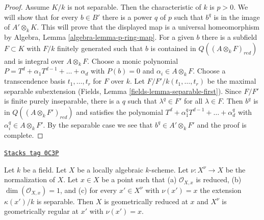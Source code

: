\begin{proof}
\medskip\noindent
Assume $K/k$ is not separable. Then the characteristic of $k$ is $p > 0$.
We will show that for every $b \in B'$ there is a power $q$ of $p$
such that $b^q$ is in the image of $A' \otimes_k K$. This will prove
that the displayed map is a universal homeomorphism by
Algebra, Lemma \ref{algebra-lemma-p-ring-map}.
For a given $b$ there is a subfield $F \subset K$
with $F/k$ finitely generated such that $b$ is contained in
$Q((A \otimes_k F)_{red})$ and is integral over $A \otimes_k F$.
Choose a monic polynomial $P = T^d + \alpha_1 T^{d - 1} + \ldots + \alpha _d$
with $P(b) = 0$ and $\alpha_i \in A \otimes_k F$.
Choose a transcendence basis $t_1, \ldots, t_r$ for $F$ over $k$.
Let $F/F'/k(t_1, \ldots, t_r)$ be the maximal separable
subextension (Fields,  Lemma \ref{fields-lemma-separable-first}).
Since $F/F'$ is finite purely inseparable, there is a $q$ such
that $\lambda^q \in F'$ for all $\lambda \in F$. Then $b^q$ is
in $Q((A \otimes_k F')_{red})$ and satisfies the polynomial
$T^d + \alpha_1^q T^{d - 1} + \ldots + \alpha _d^q$ with
$\alpha_i^q \in A \otimes_k F'$. By the separable case
we see that $b^q \in A' \otimes_k F'$ and the proof is complete.
\end{proof}

\begin{lemma}
\label{varieties-lemma-geometrically-normal-in-codim-1}
\href{https://stacks.math.columbia.edu/tag/0C3P}{\texttt{Stacks tag 0C3P}}

Let $k$ be a field. Let $X$ be a locally algebraic $k$-scheme.
Let $\nu : X^\nu \to X$ be the normalization of $X$.
Let $x \in X$ be a point such that (a) $\mathcal{O}_{X, x}$
is reduced, (b) $\dim(\mathcal{O}_{X, x}) = 1$, and (c)
for every $x' \in X^\nu$ with $\nu(x') = x$ the extension
$\kappa(x')/k$ is separable. Then $X$ is geometrically reduced at $x$
and $X^\nu$ is geometrically regular at $x'$ with $\nu(x') = x$.
\end{lemma}

